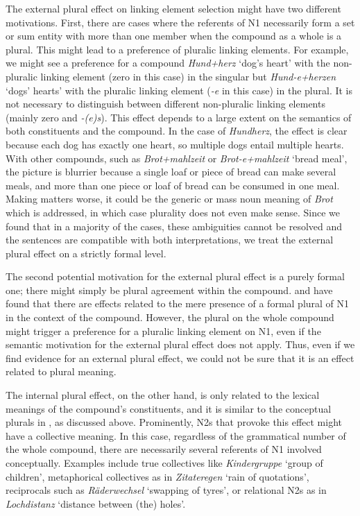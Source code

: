 \vspace{\baselineskip}

The external plural effect on linking element selection might have two different motivations.
First, there are cases where the referents of N1 necessarily form a set or sum entity with more than one member when the compound as a whole is a plural.
This might lead to a preference of pluralic linking elements.
For example, we might see a preference for a compound \textit{Hund+herz} `dog's heart' with the non-pluralic linking element (zero in this case) in the singular but \textit{Hund-e+herzen} `dogs' hearts' with the pluralic linking element (\textit{-e} in this case) in the plural.
It is not necessary to distinguish between different non-pluralic linking elements (mainly zero and \textit{-(e)s}).
This effect depends to a large extent on the semantics of both constituents and the compound.
In the case of \textit{Hundherz}, the effect is clear because each dog has exactly one heart, so multiple dogs entail multiple hearts.
With other compounds, such as \textit{Brot+mahlzeit} or \textit{Brot-e+mahlzeit} `bread meal', the picture is blurrier because a single loaf or piece of bread can make several meals, and more than one piece or loaf of bread can be consumed in one meal.
Making matters worse, it could be the generic or mass noun meaning of \textit{Brot} which is addressed, in which case plurality does not even make sense.
Since we found that in a majority of the cases, these ambiguities cannot be resolved and the sentences are compatible with both interpretations, we treat the external plural effect on a strictly formal level.

The second potential motivation for the external plural effect is a purely formal one; there might simply be plural agreement within the compound.
\textcite{BangaEa2013a} and \textcite{BangaEa2013b} have found that there are effects related to the mere presence of a formal plural of N1 in the context of the compound.
However, the plural on the whole compound might trigger a preference for a pluralic linking element on N1, even if the semantic motivation for the external plural effect does not apply.
Thus, even if we find evidence for an external plural effect, we could not be sure that it is an effect related to plural meaning.

The internal plural effect, on the other hand, is only related to the lexical meanings of the compound's constituents, and it is similar to the conceptual plurals in \textcite{BangaEa2013b}, as discussed above.
Prominently, N2s that provoke this effect might have a collective meaning.
In this case, regardless of the grammatical number of the whole compound, there are necessarily several referents of N1 involved conceptually.
Examples include true collectives like \textit{Kindergruppe} `group of children', metaphorical collectives as in \textit{Zitateregen} `rain of quotations', reciprocals such as \textit{Räderwechsel} `swapping of tyres', or relational N2s as in \textit{Lochdistanz} `distance between (the) holes'.

